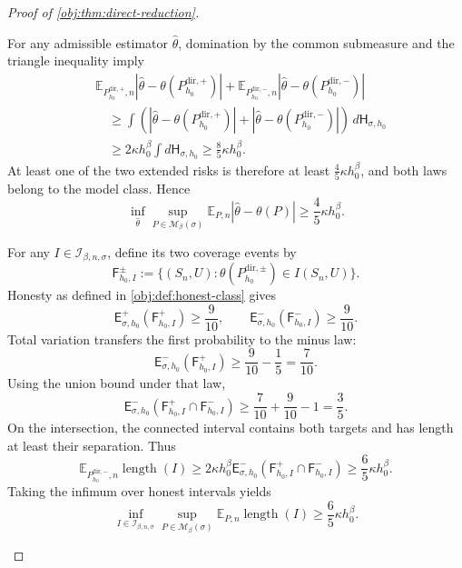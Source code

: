 \begin{proof}[Proof of \cref{obj:thm:direct-reduction}]
\begin{enumerate}
For any admissible estimator \(\widehat\theta\), domination by the common submeasure and the triangle inequality imply
\[
\begin{aligned}
&\mathbb E_{P_{h_0}^{\mathrm{dir},+},n}
|\widehat\theta-\theta(P_{h_0}^{\mathrm{dir},+})|
+
\mathbb E_{P_{h_0}^{\mathrm{dir},-},n}
|\widehat\theta-\theta(P_{h_0}^{\mathrm{dir},-})|\\
&\quad\ge
\int\left(
|\widehat\theta-\theta(P_{h_0}^{\mathrm{dir},+})|
+
|\widehat\theta-\theta(P_{h_0}^{\mathrm{dir},-})|
\right)\,d\mathsf H_{\sigma,h_0}\\
&\quad\ge
2\kappa h_0^\beta\int d\mathsf H_{\sigma,h_0}
\ge\frac85\kappa h_0^\beta.
\end{aligned}
\]
At least one of the two extended risks is therefore at least
\(\frac45\kappa h_0^\beta\), and both laws belong to the model class. Hence
\[
\inf_{\widehat\theta}
\sup_{P\in\mathcal M_\beta(\sigma)}
\mathbb E_{P,n}|\widehat\theta-\theta(P)|
\ge\frac45\kappa h_0^\beta.
\]

For any \(I\in\mathcal I_{\beta,n,\sigma}\), define its two coverage events by
\[
\mathsf F_{h_0,I}^{\pm}
:=
\{(S_n,U):\theta(P_{h_0}^{\mathrm{dir},\pm})\in I(S_n,U)\}.
\]
Honesty as defined in \cref{obj:def:honest-class} gives
\[
\mathsf E_{\sigma,h_0}^{+}(\mathsf F_{h_0,I}^{+})\ge\frac9{10},
\qquad
\mathsf E_{\sigma,h_0}^{-}(\mathsf F_{h_0,I}^{-})\ge\frac9{10}.
\]
Total variation transfers the first probability to the minus law:
\[
\mathsf E_{\sigma,h_0}^{-}(\mathsf F_{h_0,I}^{+})
\ge\frac9{10}-\frac15=\frac7{10}.
\]
Using the union bound under that law,
\[
\mathsf E_{\sigma,h_0}^{-}
(\mathsf F_{h_0,I}^{+}\cap\mathsf F_{h_0,I}^{-})
\ge\frac7{10}+\frac9{10}-1=\frac35.
\]
On the intersection, the connected interval contains both targets and has length at least their separation. Thus
\[
\mathbb E_{P_{h_0}^{\mathrm{dir},-},n}\operatorname{length}(I)
\ge2\kappa h_0^\beta
\mathsf E_{\sigma,h_0}^{-}
(\mathsf F_{h_0,I}^{+}\cap\mathsf F_{h_0,I}^{-})
\ge\frac65\kappa h_0^\beta.
\]
Taking the infimum over honest intervals yields
\[
\inf_{I\in\mathcal I_{\beta,n,\sigma}}
\sup_{P\in\mathcal M_\beta(\sigma)}
\mathbb E_{P,n}\operatorname{length}(I)
\ge\frac65\kappa h_0^\beta.
\]


\end{enumerate}
\end{proof}
